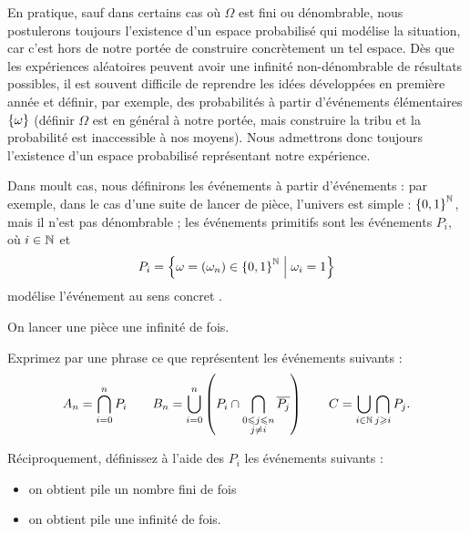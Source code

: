 En pratique, sauf dans certains cas où \(\Omega\) est fini ou dénombrable, nous postulerons toujours l'existence d'un espace probabilisé qui modélise la situation, car c'est hors de notre portée de construire concrètement un tel espace. Dès que les expériences aléatoires peuvent avoir une infinité non-dénombrable de résultats possibles, il est souvent difficile de reprendre les idées développées en première année et définir, par exemple, des probabilités à partir d'événements élémentaires \(\left\lbrace\omega\right\rbrace\) (définir \(\Omega\) est en général à notre portée, mais construire la tribu et la probabilité est inaccessible à nos moyens). Nous admettrons donc toujours l'existence d'un espace probabilisé représentant notre expérience.

Dans moult cas, nous définirons les événements à partir d'événements  : par exemple, dans le cas d'une suite de lancer de pièce, l'univers est simple : \(\left\lbrace0,1\right\rbrace^{\mathbb{N}}\), mais il n'est pas dénombrable ; les événements primitifs sont les événements \(P_i\), où \(i\in\mathbb{N}\) et \[P_i=\left\lbrace\omega=\left(\omega_n\right)\in\left\lbrace0,1\right\rbrace^{\mathbb{N}}\;\middle|\;\omega_i=1\right\rbrace\] modélise l'événement au sens concret .

\begin{exo}
On lancer une pièce une infinité de fois.

Exprimez par une phrase ce que représentent les événements suivants : \[A_n=\bigcap_{i=0}^nP_i\qquad B_n=\bigcup_{i=0}^n\left(P_i\cap\bigcap_{\substack{0\leqslant j\leqslant n \\ j\not=i}}\overline{P_j}\right)\qquad C=\bigcup_{i\in\mathbb{N}}\bigcap_{j\geqslant i}P_j.\]

Réciproquement, définissez à l'aide des \(P_i\) les événements suivants :

\begin{itemize}
    \item on obtient pile un nombre fini de fois \\
    \item on obtient pile une infinité de fois.
\end{itemize}
\end{exo}

